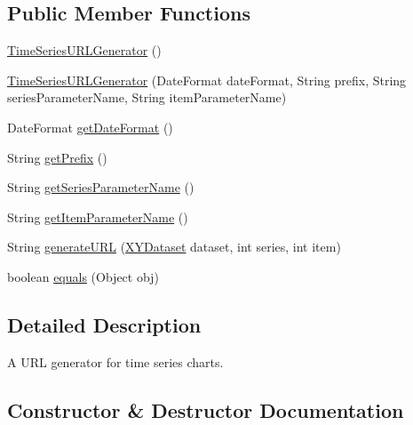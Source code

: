 \subsection*{Public Member Functions}
\begin{DoxyCompactItemize}
\item 
\mbox{\hyperlink{classorg_1_1jfree_1_1chart_1_1urls_1_1_time_series_u_r_l_generator_a87025b9f9b0ee836a1d12ff44915a28a}{Time\+Series\+U\+R\+L\+Generator}} ()
\item 
\mbox{\hyperlink{classorg_1_1jfree_1_1chart_1_1urls_1_1_time_series_u_r_l_generator_a2c060d99ed7c69bb9ff5cca4a9082472}{Time\+Series\+U\+R\+L\+Generator}} (Date\+Format date\+Format, String prefix, String series\+Parameter\+Name, String item\+Parameter\+Name)
\item 
Date\+Format \mbox{\hyperlink{classorg_1_1jfree_1_1chart_1_1urls_1_1_time_series_u_r_l_generator_a354a2b3cf470425e43a1bcac0d62d5bd}{get\+Date\+Format}} ()
\item 
String \mbox{\hyperlink{classorg_1_1jfree_1_1chart_1_1urls_1_1_time_series_u_r_l_generator_adcdf951cbe072a4822b042ac5d022018}{get\+Prefix}} ()
\item 
String \mbox{\hyperlink{classorg_1_1jfree_1_1chart_1_1urls_1_1_time_series_u_r_l_generator_a66740e8b984c7448aad875a25c7d9a7c}{get\+Series\+Parameter\+Name}} ()
\item 
String \mbox{\hyperlink{classorg_1_1jfree_1_1chart_1_1urls_1_1_time_series_u_r_l_generator_ab7314eb3529c095e1d0f1204f1be27d0}{get\+Item\+Parameter\+Name}} ()
\item 
String \mbox{\hyperlink{classorg_1_1jfree_1_1chart_1_1urls_1_1_time_series_u_r_l_generator_a28523c0aa3176331e5cdf8322b714f19}{generate\+U\+RL}} (\mbox{\hyperlink{interfaceorg_1_1jfree_1_1data_1_1xy_1_1_x_y_dataset}{X\+Y\+Dataset}} dataset, int series, int item)
\item 
boolean \mbox{\hyperlink{classorg_1_1jfree_1_1chart_1_1urls_1_1_time_series_u_r_l_generator_a104243f2f96931945d516c5415e13953}{equals}} (Object obj)
\end{DoxyCompactItemize}


\subsection{Detailed Description}
A U\+RL generator for time series charts. 

\subsection{Constructor \& Destructor Documentation}
\mbox{\label{classorg_1_1jfree_1_1chart_1_1urls_1_1_time_series_u_r_l_generator_a87025b9f9b0ee836a1d12ff44915a28a}} 
